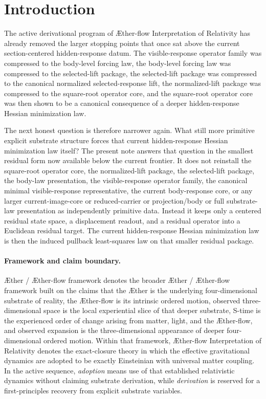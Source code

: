 \documentclass[11pt]{article}
\newcommand{\Aether}{\AE{}ther}
\newcommand{\Aflow}{\AE{}ther-flow}
\newcommand{\TheoryName}{\Aflow{} Interpretation of Relativity}
\newcommand{\TheoryProgram}{\Aether{} / \Aflow{} framework}
\begin{document}
\section{Introduction}

The active derivational program of \TheoryName{} has already removed the larger stopping points that once sat above the current section-centered hidden-response datum. The visible-response operator family was compressed to the body-level forcing law, the body-level forcing law was compressed to the selected-lift package, the selected-lift package was compressed to the canonical normalized selected-response lift, the normalized-lift package was compressed to the square-root operator core, and the square-root operator core was then shown to be a canonical consequence of a deeper hidden-response Hessian minimization law.

The next honest question is therefore narrower again. What still more primitive explicit substrate structure forces that current hidden-response Hessian minimization law itself? The present note answers that question in the smallest residual form now available below the current frontier. It does not reinstall the square-root operator core, the normalized-lift package, the selected-lift package, the body-law presentation, the visible-response operator family, the canonical minimal visible-response representative, the current body-response core, or any larger current-image-core or reduced-carrier or projection/body or full substrate-law presentation as independently primitive data. Instead it keeps only a centered residual state space, a displacement readout, and a residual operator into a Euclidean residual target. The current hidden-response Hessian minimization law is then the induced pullback least-squares law on that smaller residual package.

\paragraph{Framework and claim boundary.}
\TheoryProgram{} denotes the broader \Aether{} / \Aflow{} framework built on the claims that the \Aether{} is the underlying four-dimensional substrate of reality, the \Aflow{} is its intrinsic ordered motion, observed three-dimensional space is the local experiential slice of that deeper substrate, S-time is the experienced order of change arising from matter, light, and the \Aflow{}, and observed expansion is the three-dimensional appearance of deeper four-dimensional ordered motion. Within that framework, \TheoryName{} denotes the exact-closure theory in which the effective gravitational dynamics are adopted to be exactly Einsteinian with universal matter coupling. In the active sequence, \emph{adoption} means use of that established relativistic dynamics without claiming substrate derivation, while \emph{derivation} is reserved for a first-principles recovery from explicit substrate variables.
\end{document}
